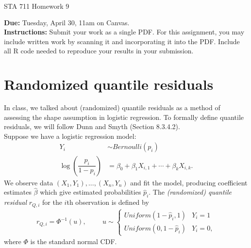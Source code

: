 \documentclass[11pt]{article}
\begin{document}
\begin{center}
\Large
STA 711 Homework 9\\
\normalsize
\vspace{5mm}
\end{center}

\noindent \textbf{Due:} Tuesday, April 30, 11am on Canvas.\\ 

\noindent \textbf{Instructions:} Submit your work as a single PDF. For this assignment, you may include written work by scanning it and incorporating it into the PDF. Include all R code needed to reproduce your results in your submission.

\section*{Randomized quantile residuals}

In class, we talked about (randomized) quantile residuals as a method of assessing the shape assumption in logistic regression. To formally define quantile residuals, we will follow Dunn and Smyth (Section 8.3.4.2).\\

\noindent Suppose we have a logistic regression model:
\begin{align*}
Y_i & \sim Bernoulli(p_i) \\
\log \left( \dfrac{p_i}{1 - p_i} \right) &= \beta_0 + \beta_1 X_{i,1} + \cdots + \beta_k X_{i,k}.
\end{align*}
We observe data $(X_1, Y_1), ..., (X_n, Y_n)$ and fit the model, producing coefficient estimates $\widehat{\beta}$ which give estimated probabilities $\widehat{p}_i$. The \textit{(randomized) quantile residual} $r_{Q,i}$ for the $i$th observation is defined by
\begin{align*}
r_{Q, i} = \Phi^{-1}(u), \hspace{1cm} u \sim \begin{cases}
Uniform(1 - \widehat{p}_i, 1) & Y_i = 1 \\
Uniform(0, 1 - \widehat{p}_i) & Y_i = 0,
\end{cases}
\end{align*}
where $\Phi$ is the standard normal CDF.
\end{document}
